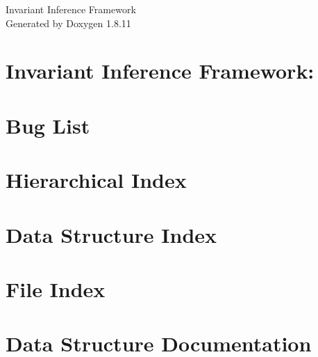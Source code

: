 \documentclass[twoside]{book}
\newcommand{\+}{\discretionary{\mbox{\scriptsize$\hookleftarrow$}}{}{}}
\newcommand{\clearemptydoublepage}{%
  \newpage{\pagestyle{empty}\cleardoublepage}%
}
\begin{document}
\hypersetup{pageanchor=false,
             bookmarks=true,
             bookmarksnumbered=true,
             pdfencoding=unicode
            }
\begin{titlepage}
\vspace*{7cm}
\begin{center}%
{\Large Invariant Inference Framework }\\
\vspace*{1cm}
{\large Generated by Doxygen 1.8.11}\\
\end{center}
\end{titlepage}
\clearemptydoublepage
\tableofcontents
\clearemptydoublepage
{}
\hypersetup{pageanchor=true}

\chapter{Invariant Inference Framework\+:}
\label{md_README}
\hypertarget{md_README}{}

\chapter{Bug List}
\label{bug}
\hypertarget{bug}{}

\chapter{Hierarchical Index}

\chapter{Data Structure Index}

\chapter{File Index}

\chapter{Data Structure Documentation}

























\end{document}
